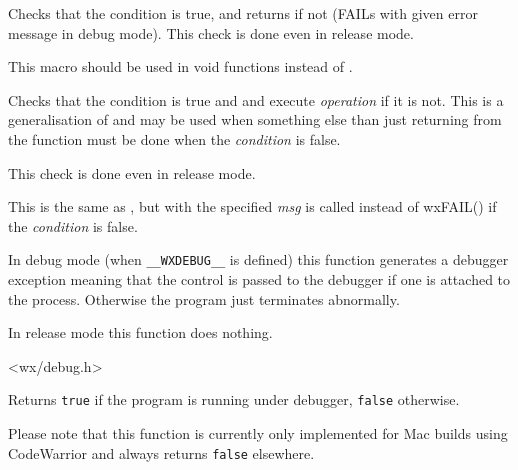 \label{wxcheckret}


Checks that the condition is true, and returns if not (FAILs with given error
message in debug mode). This check is done even in release mode.

This macro should be used in void functions instead of
.


\label{wxcheck2}


Checks that the condition is true and  and execute
{\it operation} if it is not. This is a generalisation of
 and may be used when something else than just
returning from the function must be done when the {\it condition} is false.

This check is done even in release mode.


\label{wxcheck2msg}


This is the same as , but
 with the specified {\it msg} is called
instead of wxFAIL() if the {\it condition} is false.


\label{wxtrap}


In debug mode (when {\tt \_\_WXDEBUG\_\_} is defined) this function generates a
debugger exception meaning that the control is passed to the debugger if one is
attached to the process. Otherwise the program just terminates abnormally.

In release mode this function does nothing.


<wx/debug.h>



\label{wxisdebuggerrunning}


Returns {\tt true} if the program is running under debugger, {\tt false} 
otherwise.

Please note that this function is currently only implemented for Mac builds
using CodeWarrior and always returns {\tt false} elsewhere.




